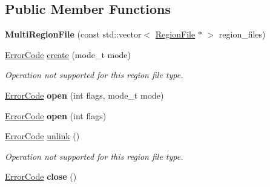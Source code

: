 \subsection*{Public Member Functions}
\begin{DoxyCompactItemize}
\item 
{\bfseries Multi\+Region\+File} (const std\+::vector$<$ \hyperlink{classalps_1_1RegionFile}{Region\+File} $\ast$ $>$ region\+\_\+files)\hypertarget{classalps_1_1MultiRegionFile_ae4e25dd6261d7a1745a2e355c14ed11e}{}\label{classalps_1_1MultiRegionFile_ae4e25dd6261d7a1745a2e355c14ed11e}

\item 
\hyperlink{group__ERRORCODES_ga6263a3c9a0b8d36aea21cdd835ac99fe}{Error\+Code} \hyperlink{classalps_1_1MultiRegionFile_a914948b93698e5bf84792f793a2c6df0}{create} (mode\+\_\+t mode)\hypertarget{classalps_1_1MultiRegionFile_a914948b93698e5bf84792f793a2c6df0}{}\label{classalps_1_1MultiRegionFile_a914948b93698e5bf84792f793a2c6df0}

\begin{DoxyCompactList}\small\item\em Operation not supported for this region file type. \end{DoxyCompactList}\item 
\hyperlink{group__ERRORCODES_ga6263a3c9a0b8d36aea21cdd835ac99fe}{Error\+Code} {\bfseries open} (int flags, mode\+\_\+t mode)\hypertarget{classalps_1_1MultiRegionFile_ada71637b82174b46b183fbae8587734e}{}\label{classalps_1_1MultiRegionFile_ada71637b82174b46b183fbae8587734e}

\item 
\hyperlink{group__ERRORCODES_ga6263a3c9a0b8d36aea21cdd835ac99fe}{Error\+Code} {\bfseries open} (int flags)\hypertarget{classalps_1_1MultiRegionFile_a2fb08745a10e08b8a3428396761cf9ff}{}\label{classalps_1_1MultiRegionFile_a2fb08745a10e08b8a3428396761cf9ff}

\item 
\hyperlink{group__ERRORCODES_ga6263a3c9a0b8d36aea21cdd835ac99fe}{Error\+Code} \hyperlink{classalps_1_1MultiRegionFile_ac3b66aae57953f47d15618d4a6f9f4bf}{unlink} ()\hypertarget{classalps_1_1MultiRegionFile_ac3b66aae57953f47d15618d4a6f9f4bf}{}\label{classalps_1_1MultiRegionFile_ac3b66aae57953f47d15618d4a6f9f4bf}

\begin{DoxyCompactList}\small\item\em Operation not supported for this region file type. \end{DoxyCompactList}\item 
\hyperlink{group__ERRORCODES_ga6263a3c9a0b8d36aea21cdd835ac99fe}{Error\+Code} {\bfseries close} ()\hypertarget{classalps_1_1MultiRegionFile_a9fe28ebb5704731c642fe2203648016a}{}\label{classalps_1_1MultiRegionFile_a9fe28ebb5704731c642fe2203648016a}


\end{DoxyCompactItemize}

